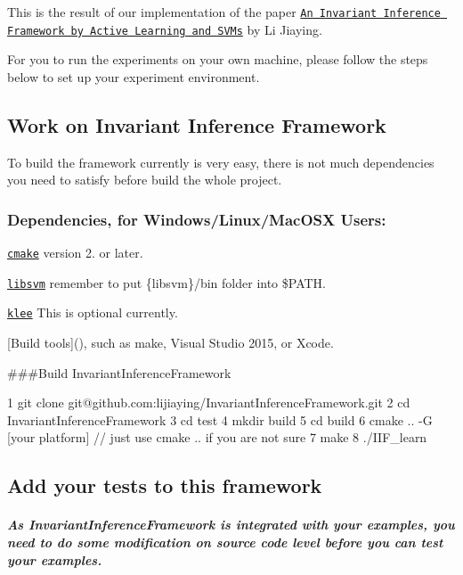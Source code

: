 This is the result of our implementation of the paper \href{../../Papers/AInvariantInferenceFrameworkbyActiveLearningandSVMs.pdf}{\tt An Invariant Inference Framework by Active Learning and S\+V\+Ms} by Li Jiaying.

For you to run the experiments on your own machine, please follow the steps below to set up your experiment environment.

\subsection*{Work on Invariant Inference Framework}

To build the framework currently is very easy, there is not much dependencies you need to satisfy before build the whole project.

\subsubsection*{Dependencies, for Windows/\+Linux/\+Mac\+O\+SX Users\+:}


\begin{DoxyItemize}
\item \href{https://cmake.org/}{\tt cmake} version 2. or later.
\item \href{https://www.csie.ntu.edu.tw/~cjlin/libsvm/}{\tt libsvm} remember to put \{libsvm\}/bin folder into \$\+P\+A\+TH.
\item \href{https://klee.github.io/}{\tt klee} This is optional currently.
\item \mbox{[}Build tools\mbox{]}(), such as make, Visual Studio 2015, or Xcode.
\end{DoxyItemize}

\#\#\#\+Build Invariant\+Inference\+Framework 
\begin{DoxyCode}
1 git clone git@github.com:lijiaying/InvariantInferenceFramework.git
2 cd InvariantInferenceFramework
3 cd test
4 mkdir build
5 cd build
6 cmake .. -G [your platform]  // just use cmake .. if you are not sure
7 make
8 ./IIF\_learn
\end{DoxyCode}


\subsection*{Add your tests to this framework}

\subparagraph*{As Invariant\+Inference\+Framework is integrated with your examples, you need to do some modification on source code level before you can test your examples.}


